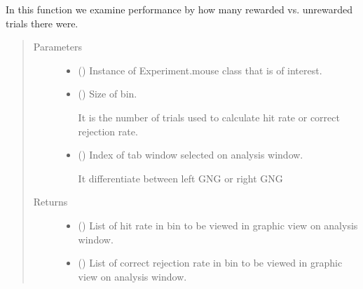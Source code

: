 \documentclass[letterpaper,10pt,english]{sphinxmanual}
\begin{document}
\begin{fulllineitems}
\label{\detokenize{NoSeMazeControl/Analysis:Analysis.Analysis.weighted_binned_performance}}
\pysigstartsignatures
{}
\pysigstopsignatures
\sphinxAtStartPar
In this function we examine performance by how many rewarded vs.
unrewarded trials there were.
\begin{quote}\begin{description}
\item[{Parameters}] \leavevmode\begin{itemize}
\item {} 
\sphinxAtStartPar
{} () \textendash{} Instance of Experiment.mouse class that is of interest.

\item {} 
\sphinxAtStartPar
{} () \textendash{} 
\sphinxAtStartPar
Size of bin.

\sphinxAtStartPar
It is the number of trials used to calculate hit rate or
correct rejection rate.


\item {} 
\sphinxAtStartPar
{} () \textendash{} 
\sphinxAtStartPar
Index of tab window selected on analysis window.

\sphinxAtStartPar
It differentiate between left GNG or right GNG


\end{itemize}

\item[{Returns}] \leavevmode
\sphinxAtStartPar
\begin{itemize}
\item {} 
\sphinxAtStartPar
{} () \textendash{} List of hit rate in bin to be viewed in graphic view on analysis
window.

\item {} 
\sphinxAtStartPar
{} () \textendash{} List of correct rejection rate in bin to be viewed in graphic view on
analysis window.

\end{itemize}


\end{description}\end{quote}

\end{fulllineitems}
\end{document}
